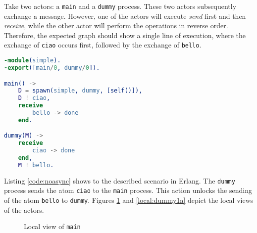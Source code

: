 \begin{exmp}

Take two actors: a \texttt{main} and a \texttt{dummy} process. These two actors subsequently exchange a  message. However, one of the actors will execute \textit{send} first and then \textit{receive}, while the other actor will perform the operations in reverse order. Therefore, the expected graph should show a single line of execution, where the exchange of \texttt{ciao} occurs first, followed by the exchange of \texttt{bello}.


\begin{lstlisting}[language=Erlang, caption=Two processes exchanging messages synchronously, label=code:noasync]
-module(simple).
-export([main/0, dummy/0]).

main() ->
    D = spawn(simple, dummy, [self()]),
    D ! ciao,
    receive
        bello -> done
    end.

dummy(M) ->
    receive
        ciao -> done
    end,
    M ! bello.
\end{lstlisting}

Listing \ref{code:noasync} shows  to the described scenario in Erlang. The \texttt{dummy} process sends the atom \texttt{ciao} to the \texttt{main} process. This action unlocks the sending of the atom \texttt{bello} to \texttt{dummy}. Figures \ref{local:main} and \ref{local:dummy1a} depict the local views of the actors.

\bigskip

\begin{figure}[ht!]
    \centering
    \caption{Local view of \texttt{main}}
    \label{local:main}
\end{figure}


\begin{figure}[ht!]
    \centering
\end{figure}
\end{exmp}
